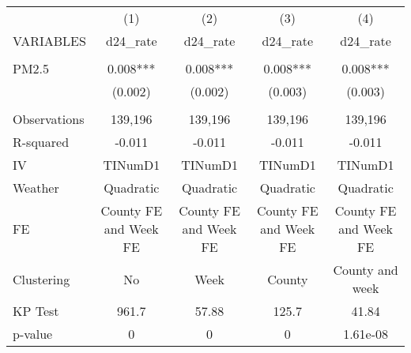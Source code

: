 \begin{tabular}{lcccc} \hline
 & (1) & (2) & (3) & (4) \\
VARIABLES & d24\_rate & d24\_rate & d24\_rate & d24\_rate \\ \hline
 &  &  &  &  \\
PM2.5 & 0.008*** & 0.008*** & 0.008*** & 0.008*** \\
 & (0.002) & (0.002) & (0.003) & (0.003) \\
 &  &  &  &  \\
Observations & 139,196 & 139,196 & 139,196 & 139,196 \\
R-squared & -0.011 & -0.011 & -0.011 & -0.011 \\
IV & TINumD1 & TINumD1 & TINumD1 & TINumD1 \\
Weather & Quadratic & Quadratic & Quadratic & Quadratic \\
FE & County FE and Week FE & County FE and Week FE & County FE and Week FE & County FE and Week FE \\
Clustering & No & Week & County & County and week \\
KP Test & 961.7 & 57.88 & 125.7 & 41.84 \\
 p-value & 0 & 0 & 0 & 1.61e-08 \\ \hline
\end{tabular}
